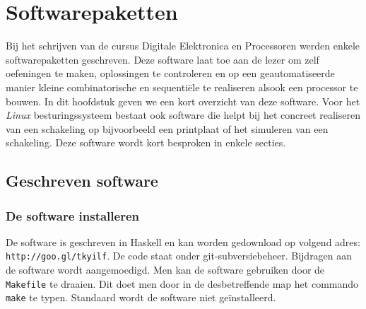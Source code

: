 \chapter{Softwarepaketten}
\begin{chapterintro}
Bij het schrijven van de cursus Digitale Elektronica en Processoren werden enkele softwarepaketten geschreven. Deze software laat toe aan de lezer om zelf oefeningen te maken, oplossingen te controleren en op een geautomatiseerde manier kleine combinatorische en sequenti\"ele te realiseren alsook een processor te bouwen. In dit hoofdstuk geven we een kort overzicht van deze software. Voor het \emph{Linux} besturingssysteem bestaat ook software die helpt bij het concreet realiseren van een schakeling op bijvoorbeeld een printplaat of het simuleren van een schakeling. Deze software wordt kort besproken in enkele secties.
\end{chapterintro}
\minitoc[n]
\section{Geschreven software}
\subsection{De software installeren}
De software is geschreven in Haskell en kan worden gedownload op volgend adres: \texttt{http://goo.gl/tkyilf}. De code staat onder git-subversiebeheer. Bijdragen aan de software wordt aangemoedigd. Men kan de software gebruiken door de \texttt{Makefile} te draaien. Dit doet men door in de desbetreffende map het commando \texttt{make} te typen. Standaard wordt de software niet ge\"installeerd.